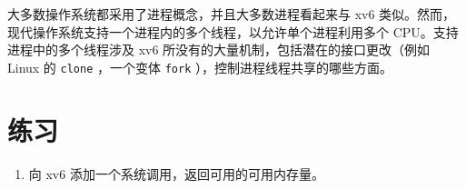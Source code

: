 大多数操作系统都采用了进程概念，并且大多数进程看起来与 xv6 类似。然而，现代操作系统支持一个进程内的多个线程，以允许单个进程利用多个 CPU。支持进程中的多个线程涉及 xv6 所没有的大量机制，包括潜在的接口更改（例如 Linux 的
    \lstinline{clone}    ，一个变体
    \lstinline{fork}    ），控制进程线程共享的哪些方面。
    \section{练习  }     

   \begin{enumerate}


   \item   向 xv6 添加一个系统调用，返回可用的可用内存量。  \end{enumerate}     


